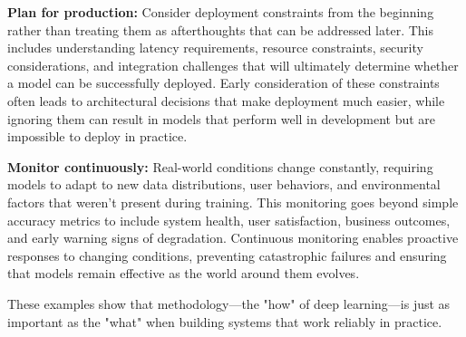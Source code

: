 \textbf{Plan for production:} Consider deployment constraints from the beginning rather than treating them as afterthoughts that can be addressed later. This includes understanding latency requirements, resource constraints, security considerations, and integration challenges that will ultimately determine whether a model can be successfully deployed. Early consideration of these constraints often leads to architectural decisions that make deployment much easier, while ignoring them can result in models that perform well in development but are impossible to deploy in practice.

\textbf{Monitor continuously:} Real-world conditions change constantly, requiring models to adapt to new data distributions, user behaviors, and environmental factors that weren't present during training. This monitoring goes beyond simple accuracy metrics to include system health, user satisfaction, business outcomes, and early warning signs of degradation. Continuous monitoring enables proactive responses to changing conditions, preventing catastrophic failures and ensuring that models remain effective as the world around them evolves.

These examples show that methodology—the "how" of deep learning—is just as important as the "what" when building systems that work reliably in practice.

